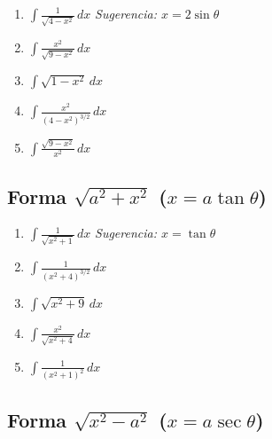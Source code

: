 \documentclass[12pt, letterpaper]{article}
\newcommand{\dx}{\,dx}
\begin{document}
\begin{enumerate}[label=\textbf{\arabic*.}, leftmargin=*, itemsep=12pt, start=84]

  \item \facil\quad
    $\displaystyle\int \frac{1}{\sqrt{4-x^2}}\dx$
    \qquad\textit{Sugerencia: $x = 2\sin\theta$}

  \item \medio\quad
    $\displaystyle\int \frac{x^2}{\sqrt{9-x^2}}\dx$

  \item \medio\quad
    $\displaystyle\int \sqrt{1-x^2}\dx$

  \item \medio\quad
    $\displaystyle\int \frac{x^2}{(4-x^2)^{3/2}}\dx$

  \item \dificil\quad
    $\displaystyle\int \frac{\sqrt{9-x^2}}{x^2}\dx$

\end{enumerate}

\subsection{Forma $\sqrt{a^2 + x^2}$ \;($x = a\tan\theta$)}

\begin{enumerate}[label=\textbf{\arabic*.}, leftmargin=*, itemsep=12pt, start=89]

  \item \facil\quad
    $\displaystyle\int \frac{1}{\sqrt{x^2+1}}\dx$
    \qquad\textit{Sugerencia: $x = \tan\theta$}

  \item \medio\quad
    $\displaystyle\int \frac{1}{(x^2+4)^{3/2}}\dx$

  \item \medio\quad
    $\displaystyle\int \sqrt{x^2+9}\dx$

  \item \medio\quad
    $\displaystyle\int \frac{x^2}{\sqrt{x^2+4}}\dx$

  \item \dificil\quad
    $\displaystyle\int \frac{1}{(x^2+1)^2}\dx$

\end{enumerate}

\subsection{Forma $\sqrt{x^2 - a^2}$ \;($x = a\sec\theta$)}
\end{document}
